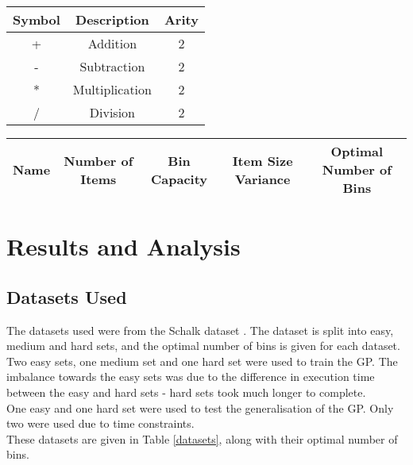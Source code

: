 \documentclass[conference]{IEEEtran}
\begin{document}
\begin{table*}[h]
\centering
\renewcommand{\arraystretch}{1.3}
\caption{Function Set}
\label{function_set}
\begin{tabular}{c|c|c}
Symbol & Description & Arity \\
\hline
+ & Addition & 2 \\
- & Subtraction & 2 \\
* & Multiplication & 2 \\
/ & Division & 2 \\
\hline
\end{tabular}
\end{table*}



\begin{table*}[t!]
\centering
\renewcommand{\arraystretch}{1.3}
\caption{Datasets Used}
\label{datasets}
\begin{tabular}{c|c|c|c|c}
 Name & Number of Items & Bin Capacity & Item Size Variance & Optimal Number of Bins \\
\hline

\hline

\end{tabular}
\end{table*}

\section{Results and Analysis}
\subsection{Datasets Used}
The datasets used were from the Schalk dataset \cite{schollset}. The dataset is split into easy, medium and hard sets, and the optimal number of bins is given for each dataset.\\

Two easy sets, one medium set and one hard set were used to train the GP. The imbalance towards the easy sets was due to the difference in execution time between the easy and hard sets - hard sets took much longer to complete.\\

One easy and one hard set were used to test the generalisation of the GP. Only two were used due to time constraints.\\

These datasets are given in Table \ref{datasets}, along with their optimal number of bins.\\
\end{document}
